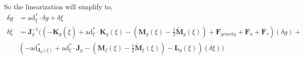 \documentclass[10pt]{article}
\newcommand{\ad}{\ensuremath{\mathrm{ad}}}
\begin{document}
%
So the linearization will simplify to,
\begin{align*}
\delta \dot{g} &= \ad^*_{\xi} \cdot \delta g + \delta \xi \\
\delta \dot{\xi} &=  \mathbf{J}_g^{-1} ((-\mathbf{K}_g(\dot{\xi}) + \ad^*_\xi \cdot \mathbf{K}_g(\xi)- (\mathbf{M}_g(\xi) - \frac{1}{2}\tilde{\mathbf{M}}_g(\xi)) + \mathbf{F}_{gravity} + \mathbf{F}_a + \mathbf{F}_\tau) (\delta g) + \\
& (-\ad^*_{\mathbf{J}_g(\xi)} + \ad^*_\xi \cdot \mathbf{J}_g - (\mathbf{M}_\xi(\xi) - \frac{1}{2}\tilde{\mathbf{M}}_\xi(\xi)) - \mathbf{L}_g(\xi)) (\delta \xi))
\end{align*}
\end{document}
